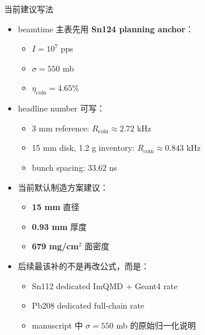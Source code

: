 \documentclass[aspectratio=169]{ctexbeamer}
\begin{document}
\begin{frame}{当前建议写法}
\begin{itemize}
  \item beamtime 主表先用 \textbf{Sn124 planning anchor}：
  \begin{itemize}
    \item $I = 10^7$ pps
    \item $\sigma = 550$ mb
    \item $\eta_{\mathrm{coin}} = 4.65\%$
  \end{itemize}
  \item headline number 可写：
  \begin{itemize}
    \item 3 mm reference: $R_{\mathrm{coin}} \approx 2.72$ kHz
    \item 15 mm disk, 1.2 g inventory: $R_{\mathrm{coin}} \approx 0.843$ kHz
    \item bunch spacing: $33.62$ ns
  \end{itemize}
  \item 当前默认制造方案建议：
  \begin{itemize}
    \item \textbf{15 mm} 直径
    \item \textbf{0.93 mm} 厚度
    \item \textbf{679 mg/cm$^2$} 面密度
  \end{itemize}
  \item 后续最该补的不是再改公式，而是：
  \begin{itemize}
    \item Sn112 dedicated ImQMD + Geant4 rate
    \item Pb208 dedicated full-chain rate
    \item manuscript 中 $\sigma = 550$ mb 的原始归一化说明
  \end{itemize}
\end{itemize}
\end{frame}
\end{document}
